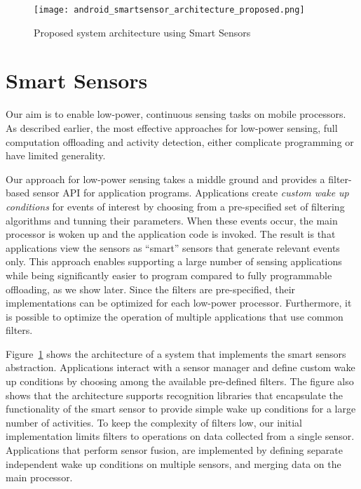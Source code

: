 
\begin{figure}[t]
	\texttt{[image: android\_smartsensor\_architecture\_proposed.png]}
	\caption{Proposed system architecture using Smart Sensors}
    \label{fig:smartarchitecture}
\end{figure}


\section{Smart Sensors}
\label{sec:approach}

Our aim is to enable low-power, continuous sensing tasks on mobile
processors.  As described earlier, the most effective approaches for
low-power sensing, full computation offloading and activity detection,
either complicate programming or have limited generality.

Our approach for low-power sensing takes a middle ground and provides
a filter-based sensor API for application programs. Applications
create {\em custom wake up conditions} for events of interest by
choosing from a pre-specified set of filtering algorithms and tunning
their parameters.  When these events occur, the main processor is
woken up and the application code is invoked. The result is that
applications view the sensors as ``smart'' sensors that generate
relevant events only. This approach enables supporting a large number
of sensing applications while being significantly easier to program
compared to fully programmable offloading, as we show later. Since the
filters are pre-specified, their implementations can be optimized for
each low-power processor. Furthermore, it is possible to optimize the
operation of multiple applications that use common filters.

Figure~\ref{fig:smartarchitecture} shows the architecture of a
system that implements the smart sensors abstraction.  Applications
interact with a sensor manager and define custom wake up conditions by
choosing among the available pre-defined filters.  The figure also
shows that the architecture supports recognition libraries that
encapsulate the functionality of the smart sensor to provide simple
wake up conditions for a large number of activities.  To keep the
complexity of filters low, our initial implementation limits filters
to operations on data collected from a single sensor.  Applications
that perform sensor fusion, are implemented by defining separate
independent wake up conditions on multiple sensors, and merging data on
the main processor.





